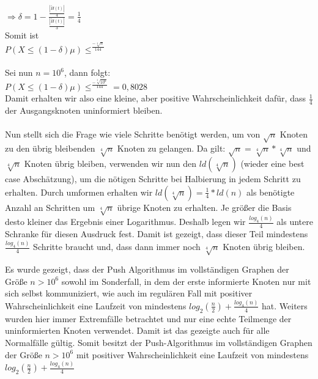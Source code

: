\documentclass[12pt,a4paper]{report}
\begin{document}
\begin{itemize}
	$\Rightarrow \delta =1-\frac{\frac{|\tilde{H}(t)|}{4}}{\frac{|\tilde{H}(t)|}{3}} = \frac{1}{4}$\\
	Somit ist\\
	$P(X\le(1-\delta)\mu)\le^{\frac{-\sqrt[4]{n}}{144}}$\\
	\\
	Sei nun $n=10^6$, dann folgt:\\
	$P(X\le(1-\delta)\mu)\le^{\frac{-\sqrt[4]{10^6}}{144}} = 0,8028$\\
	Damit erhalten wir also eine kleine, aber positive Wahrscheinlichkeit dafür, dass $\frac{1}{4}$ der Ausgangsknoten uninformiert bleiben. \\
	\\
	Nun stellt sich die Frage wie viele Schritte benötigt werden, um von $\sqrt{n}$ Knoten zu den übrig bleibenden 
	$\sqrt[4]{n}$ Knoten zu gelangen.
	Da gilt: $\sqrt{n} = \sqrt[4]{n} * \sqrt[4]{n}$ und $\sqrt[4]{n}$ Knoten übrig bleiben, verwenden wir nun den $ld(\sqrt[4]{n})$ (wieder eine best case Abschätzung),
	um die nötigen Schritte bei Halbierung in jedem Schritt zu erhalten. Durch umformen erhalten wir $ld(\sqrt[4]{n}) = \frac{1}{4}*ld(n)$
	als benötigte Anzahl an Schritten um $\sqrt[4]{n}$ übrige Knoten zu erhalten. Je größer die Basis desto kleiner das Ergebnis einer Logarithmus.
	Deshalb legen wir $\frac{log_4(n)}{4}$ als untere Schranke für diesen Ausdruck fest. Damit ist gezeigt, dass dieser Teil mindestens $\frac{log_4(n)}{4}$ Schritte braucht und, dass dann immer noch $\sqrt[4]{n}$ Knoten übrig bleiben.
	
	
	\end{itemize}

Es wurde gezeigt, dass der Push Algorithmus im vollständigen Graphen der Größe $n > 10^6$ sowohl im Sonderfall, in dem der erste informierte Knoten nur mit sich selbst kommuniziert, 
wie auch im regulären Fall mit positiver Wahrscheinlichkeit eine Laufzeit von mindestens $log_2(\frac{n}{2})+\frac{log_4(n)}{4}$ hat.
Weiters wurden hier immer Extremfälle betrachtet und nur eine echte Teilmenge der uninformierten Knoten verwendet.
Damit ist das gezeigte auch für alle Normalfälle gültig.
Somit besitzt der Push-Algorithmus im vollständigen Graphen der Größe $n>10^6$ mit positiver Wahrscheinlichkeit eine Laufzeit von mindestens $log_2(\frac{n}{2})+\frac{log_4(n)}{4}$
\end{document}
